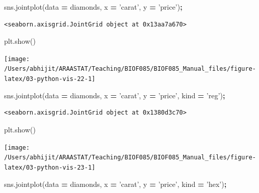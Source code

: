 \documentclass[
  letterpaper,
]{scrbook}
\newenvironment{Shaded}{\begin{snugshade}}{\end{snugshade}}
\newcommand{\NormalTok}[1]{#1}
\newcommand{\OperatorTok}[1]{\textcolor[rgb]{0.81,0.36,0.00}{\textbf{#1}}}
\newcommand{\StringTok}[1]{\textcolor[rgb]{0.31,0.60,0.02}{#1}}
\begin{document}
\begin{Shaded}
\begin{Highlighting}[]
\NormalTok{sns.jointplot(data }\OperatorTok{=}\NormalTok{ diamonds, x }\OperatorTok{=} \StringTok{'carat'}\NormalTok{, y }\OperatorTok{=} \StringTok{'price'}\NormalTok{)}\OperatorTok{;}
\end{Highlighting}
\end{Shaded}

\begin{verbatim}
<seaborn.axisgrid.JointGrid object at 0x13aa7a670>
\end{verbatim}

\begin{Shaded}
\begin{Highlighting}[]
\NormalTok{plt.show()}
\end{Highlighting}
\end{Shaded}

\begin{center}\texttt{[image: /Users/abhijit/ARAASTAT/Teaching/BIOF085/BIOF085\_Manual\_files/figure-latex/03-python-vis-22-1]} \end{center}

\begin{Shaded}
\begin{Highlighting}[]
\NormalTok{sns.jointplot(data }\OperatorTok{=}\NormalTok{ diamonds, x }\OperatorTok{=} \StringTok{'carat'}\NormalTok{, y }\OperatorTok{=} \StringTok{'price'}\NormalTok{, kind }\OperatorTok{=} \StringTok{'reg'}\NormalTok{)}\OperatorTok{;}
\end{Highlighting}
\end{Shaded}

\begin{verbatim}
<seaborn.axisgrid.JointGrid object at 0x1380d3c70>
\end{verbatim}

\begin{Shaded}
\begin{Highlighting}[]
\NormalTok{plt.show()}
\end{Highlighting}
\end{Shaded}

\begin{center}\texttt{[image: /Users/abhijit/ARAASTAT/Teaching/BIOF085/BIOF085\_Manual\_files/figure-latex/03-python-vis-23-1]} \end{center}

\begin{Shaded}
\begin{Highlighting}[]
\NormalTok{sns.jointplot(data }\OperatorTok{=}\NormalTok{ diamonds, x }\OperatorTok{=} \StringTok{'carat'}\NormalTok{, y }\OperatorTok{=} \StringTok{'price'}\NormalTok{, kind }\OperatorTok{=} \StringTok{'hex'}\NormalTok{)}\OperatorTok{;}
\end{Highlighting}
\end{Shaded}
\end{document}
